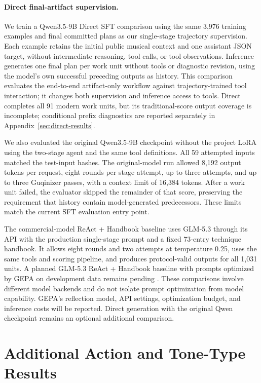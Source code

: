 \paragraph{Direct final-artifact supervision.}
We train a Qwen3.5-9B Direct SFT comparison using the same 3,976 training examples and final committed plans as our single-stage trajectory supervision. Each example retains the initial public musical context and one assistant JSON target, without intermediate reasoning, tool calls, or tool observations. Inference generates one final plan per work unit without tools or diagnostic revision, using the model's own successful preceding outputs as history. This comparison evaluates the end-to-end artifact-only workflow against trajectory-trained tool interaction; it changes both supervision and inference access to tools. Direct completes all 91 modern work units, but its traditional-score output coverage is incomplete; conditional prefix diagnostics are reported separately in Appendix~\ref{sec:direct-results}.

We also evaluated the original Qwen3.5-9B checkpoint without the project LoRA using the two-stage agent and the same tool definitions. All 59 attempted inputs matched the test-input hashes. The original-model run allowed 8,192 output tokens per request, eight rounds per stage attempt, up to three attempts, and up to three Guqinizer passes, with a context limit of 16,384 tokens. After a work unit failed, the evaluator skipped the remainder of that score, preserving the requirement that history contain model-generated predecessors. These limits match the current SFT evaluation entry point.

The commercial-model ReAct + Handbook baseline uses GLM-5.3 through its API with the production single-stage prompt and a fixed 73-entry technique handbook. It allows eight rounds and two attempts at temperature 0.25, uses the same tools and scoring pipeline, and produces protocol-valid outputs for all 1,031 units. A planned GLM-5.3 ReAct + Handbook baseline with prompts optimized by GEPA on development data remains pending \cite{agrawal2026gepa}. These comparisons involve different model backends and do not isolate prompt optimization from model capability. GEPA's reflection model, API settings, optimization budget, and inference costs will be reported. Direct generation with the original Qwen checkpoint remains an optional additional comparison.

\section{Additional Action and Tone-Type Results}
\label{sec:detailed-results}


